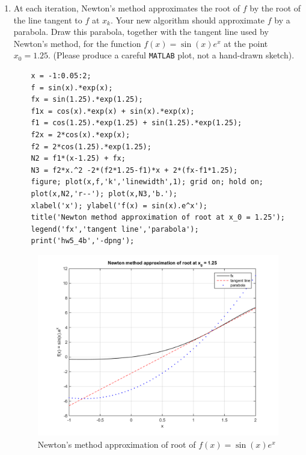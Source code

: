 \documentclass[14pt,a4paper]{article}
\begin{document}
\begin{enumerate}
	\label{4b}	
	\item At each iteration, Newton's method approximates the root of $f$ by the root of the line tangent to $f$ at $x_k$. Your new algorithm should approximate $f$ by a parabola. Draw this parabola, together with the tangent line used by Newton's method, for the function $f(x) = \sin(x)e^x$ at the point $x_0 = 1.25$. (Please produce a careful \texttt{MATLAB} plot, not a hand-drawn sketch).
	\begin{lstlisting}
	x = -1:0.05:2;
	f = sin(x).*exp(x);
	fx = sin(1.25).*exp(1.25);
	f1x = cos(x).*exp(x) + sin(x).*exp(x);
	f1 = cos(1.25).*exp(1.25) + sin(1.25).*exp(1.25);
	f2x = 2*cos(x).*exp(x);
	f2 = 2*cos(1.25).*exp(1.25);
	N2 = f1*(x-1.25) + fx;
	N3 = f2*x.^2 -2*(f2*1.25-f1)*x + 2*(fx-f1*1.25);
	figure; plot(x,f,'k','linewidth',1); grid on; hold on;
	plot(x,N2,'r--'); plot(x,N3,'b.');
	xlabel('x'); ylabel('f(x) = sin(x).e^x');
	title('Newton method approximation of root at x_0 = 1.25');
	legend('fx','tangent line','parabola');
	print('hw5_4b','-dpng');
	\end{lstlisting}
	\begin{figure}[htp]
		\centering
		\includegraphics[scale=0.7]{hw5_4b.png}
		\caption{Newton's method approximation of root of $f(x) = \sin(x)e^x$}
	\end{figure}
		

\end{enumerate}
\end{document}
